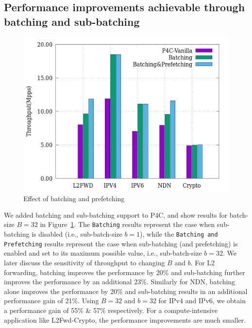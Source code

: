 \subsection{Performance improvements achievable through batching and sub-batching}
\label{batchingandprefetching}
\begin{figure}[ht]
\includegraphics[width = \linewidth]{Figures/effectofbatching.png}
\caption{Effect of batching and prefetching}
\label{fig:batchingandprefetchingfigure}
\end{figure}
We added batching and sub-batching support to P4C, and show results for batch-size $B=32$
in Figure~\ref{fig:batchingandprefetchingfigure}. The {\tt Batching} results represent the case when sub-batching
is disabled (i.e., sub-batch-size $b=1$), while the {\tt Batching and Prefetching} results represent the case
when sub-batching (and prefetching) is enabled and set to its maximum possible value, i.e., sub-batch-size $b=32$.
We later discuss the sensitivity of
throughput to changing $B$ and $b$.
For L2 forwarding, batching improves the performance by 20\% and sub-batching further improves the performance by an additional 23\%. Similarly
for NDN, batching alone improves the performance by 20\% and sub-batching results in an additional performance gain of 21\%.
Using $B=32$ and $b=32$ for IPv4 and IPv6, we obtain a performance gain of 55\% \& 57\% respectively.
For a compute-intensive application like L2Fwd-Crypto, the performance improvements are much smaller.

